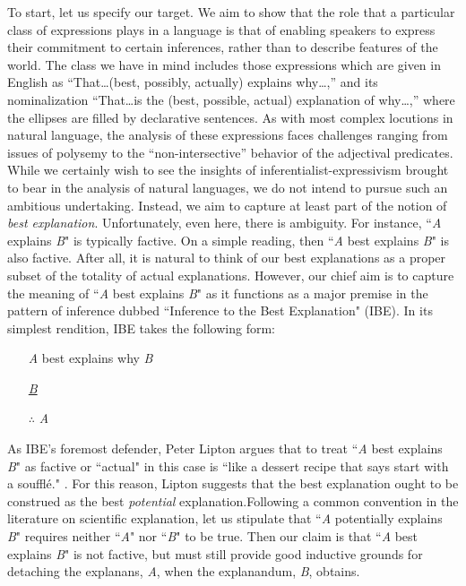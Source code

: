 \documentclass{article}
\newcounter{fncntr}
\newcommand{\fnmark}[1]{\refstepcounter{fncntr}\label{#1}\footnotemark[\getrefnumber{#1}]}
\theoremstyle{definition}
\theoremstyle{definition}
\theoremstyle{definition}
\theoremstyle{definition}
\theoremstyle{remark}
\theoremstyle{definition}
\theoremstyle{definition}
\begin{document}
To start, let us specify our target. We aim to show that the role that a particular class of expressions plays in a language is that of enabling speakers to express their commitment to certain inferences, rather than to describe features of the world. The class we have in mind includes those expressions which are given in English as ``That\ldots (best, possibly, actually) explains why\ldots,'' and its nominalization ``That\ldots is the (best, possible, actual) explanation of why\ldots,'' where the ellipses are filled by declarative sentences. As with most complex locutions in natural language, the analysis of these expressions faces challenges ranging from issues of polysemy to the ``non-intersective'' behavior of the adjectival predicates. While we certainly wish to see the insights of inferentialist-expressivism brought to bear in the analysis of natural languages, we do not intend to pursue such an ambitious undertaking. Instead, we aim to capture at least part of the notion of \textit{best explanation}. Unfortunately, even here, there is ambiguity. For instance, ``\textit{A} explains \textit{B}" is typically factive. On a simple reading, then ``\textit{A} best explains \textit{B}" is also factive. After all, it is natural to think of our best explanations as a proper subset of the totality of actual explanations. However, our chief aim is to capture the meaning of ``\textit{A} best explains \textit{B}"  as it functions as a major premise in the pattern of inference dubbed ``Inference to the Best Explanation" (IBE). In its simplest rendition, IBE takes the following form:

\begin{itemize}[itemsep=.01mm]\centering
	\item[]\textit{A} best explains why \textit{B}
	\item[]\underline{\textit{B}\hspace{2.9cm}}
	\item[$\therefore $]\textit{A}$ \quad\quad\quad\quad\quad\quad $
\end{itemize}

As IBE's foremost defender, Peter Lipton argues that to treat  ``\textit{A} best explains \textit{B}" as factive or ``actual" in this case is ``like a dessert recipe that says start with a souffl\'e." \parencite[58]{Lipton2004}. For this reason, Lipton suggests that the best explanation ought to be construed as the best \textit{potential} explanation.\fnmark{Lovely} Following a common convention in the literature on scientific explanation, let us stipulate that ``\textit{A} potentially explains \textit{B}" requires neither ``\textit{A}" nor ``\textit{B}" to be true. Then our claim is that ``\textit{A} best explains \textit{B}" is not factive, but must still provide good inductive grounds for detaching the explanans, \textit{A}, when the explanandum, \textit{B}, obtains.
\end{document}
